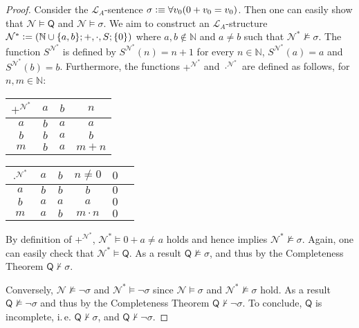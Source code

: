 \begin{proof}
Consider the $\mathcal{L}_A$-sentence $\sigma \vcentcolon \equiv \forall v_0 (0 + v_0 = v_0 )$. Then one can easily show that $\mathcal{N} \vDash \mathsf{Q}$ and $\mathcal{N} \vDash \sigma$. We aim to construct an $\mathcal{L}_A$-structure $\mathcal{N^*}\vcentcolon= (\mathbb{N} \cup \lbrace a, b \rbrace; +, \cdot, S; \lbrace 0 \rbrace)$ where $a, b \notin \mathbb{N}$ and $a \neq b$ such that $\mathcal{N^*} \nvDash \sigma$. The function $S^{\mathcal{N}^*}$ is defined by $S^{\mathcal{N}^*}(n)= n + 1$ for every $n \in \mathbb{N}$, $S^{\mathcal{N}^*}(a)= a$ and $S^{\mathcal{N}^*}(b)=b$. Furthermore, the functions $+^{\mathcal{N}^*}$ and $\cdot^{\mathcal{N}^*}$ are defined as follows, for $n,m \in \mathbb{N}$:
\begin{center}
\def\arraystretch{1.2}
\begin{tabular}{ | c | c | c | c | } 
\hline
$+^{\mathcal{N}^*}$& $a$ & $b$ & $n$\\ 
\hline
$a$ & $b$ & $a$ & $a$ \\ 
\hline
$b$ & $b$ & $a$ & $b$ \\ 
\hline
$m$ & $b$ & $a$ & $m+n$\\
\hline
\end{tabular}
\quad
\begin{tabular}{ | c | c | c | c | c | c |} 
\hline
$\cdot^{\mathcal{N}^*}$& $a$ & $b$ & $n \neq 0$ & $0$ \\ 
\hline
$a$ & $b$ & $b$ & $b$ & $0$\\ 
\hline
$b$ & $a$ & $a$ & $a$ & $0$ \\ 
\hline
$m$ & $a$ & $b$ & $m \cdot n$ & $0$\\
\hline
\end{tabular}
\end{center}
By definition of $+^{\mathcal{N}^*}$, $\mathcal{N}^* \vDash 0 + a \neq a$ holds and hence implies $\mathcal{N}^* \nvDash \sigma$. Again, one can easily check that $\mathcal{N}^* \vDash \mathsf{Q}$. As a result $\mathsf{Q} \nvDash \sigma$, and thus by the Completeness Theorem $\mathsf{Q} \nvdash \sigma$.

Conversely, $\mathcal{N} \nvDash \lnot \sigma$ and $\mathcal{N}^* \vDash \lnot \sigma$ since $\mathcal{N} \vDash \sigma$ and $\mathcal{N}^* \nvDash \sigma$ hold. As a result $\mathsf{Q} \nvDash \lnot \sigma$ and thus by the Completeness Theorem $\mathsf{Q} \nvdash \lnot \sigma$. To conclude, $\mathsf{Q}$ is incomplete, i.\,e. $\mathsf{Q} \nvdash \sigma$, and $\mathsf{Q} \nvdash \lnot \sigma$.
\end{proof}


